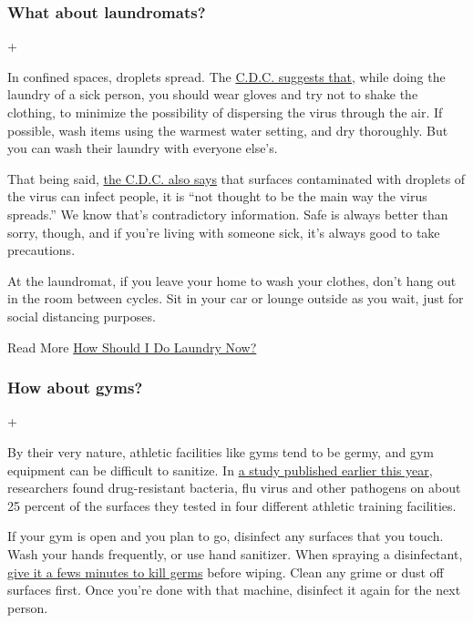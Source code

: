 \hypertarget{what-about-laundromats}{%
\subsubsection{What about laundromats?}\label{what-about-laundromats}}

+

In confined spaces, droplets spread. The
\href{https://www.cdc.gov/coronavirus/2019-ncov/prevent-getting-sick/cleaning-disinfection.html}{C.D.C.
suggests that}, while doing the laundry of a sick person, you should
wear gloves and try not to shake the clothing, to minimize the
possibility of dispersing the virus through the air. If possible, wash
items using the warmest water setting, and dry thoroughly. But you can
wash their laundry with everyone else's.

That being said,
\href{https://www.nytimes3xbfgragh.onion/2020/05/22/health/cdc-coronavirus-touching-surfaces.html}{the
C.D.C. also says} that surfaces contaminated with droplets of the virus
can infect people, it is ``not thought to be the main way the virus
spreads.'' We know that's contradictory information. Safe is always
better than sorry, though, and if you're living with someone sick, it's
always good to take precautions.

At the laundromat, if you leave your home to wash your clothes, don't
hang out in the room between cycles. Sit in your car or lounge outside
as you wait, just for social distancing purposes.

 Read More
\href{https://www.nytimes3xbfgragh.onion/2020/03/26/style/how-to-do-laundry-coronavirus.html}{How
Should I Do Laundry Now?}

\hypertarget{how-about-gyms}{%
\subsubsection{How about gyms?}\label{how-about-gyms}}

+

By their very nature, athletic facilities like gyms tend to be germy,
and gym equipment can be difficult to sanitize. In
\href{https://pubmed.ncbi.nlm.nih.gov/31660785/}{a study published
earlier this year}, researchers found drug-resistant bacteria, flu virus
and other pathogens on about 25 percent of the surfaces they tested in
four different athletic training facilities.

If your gym is open and you plan to go, disinfect any surfaces that you
touch. Wash your hands frequently, or use hand sanitizer. When spraying
a disinfectant,
\href{https://www.nytimes3xbfgragh.onion/2020/05/06/well/live/coronavirus-cleaning-cleaners-disinfectants-home.html}{give
it a fews minutes to kill germs} before wiping. Clean any grime or dust
off surfaces first. Once you're done with that machine, disinfect it
again for the next person.

